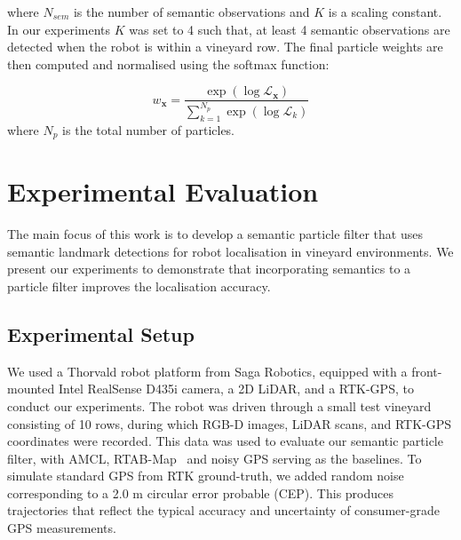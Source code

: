 \documentclass[letterpaper, 10 pt, conference]{ieeeconf}
\begin{document}
where $N_{sem}$ is the number of semantic observations and $K$ is a scaling constant. In our experiments $K$ was set to 4 such that, at least 4 semantic observations are detected when the robot is within a vineyard row. The final particle weights are then computed and normalised using the softmax function:

\begin{equation}
w_\mathbf{x} = \frac{\exp(\log \mathcal{L}_\mathbf{x})}{\sum_{k=1}^{N_p} \exp(\log \mathcal{L}_k)}
\end{equation}
%
where $N_p$ is the total number of particles.
\section{Experimental Evaluation}
\label{sec:exp}


The main focus of this work is to develop a semantic particle filter that uses semantic landmark detections for robot localisation in vineyard environments. We present our experiments to demonstrate that incorporating semantics to a particle filter improves the localisation accuracy. 

\subsection{Experimental Setup}
We used a Thorvald robot platform from Saga Robotics, equipped with a front-mounted Intel RealSense D435i camera, a 2D LiDAR, and a RTK-GPS, to conduct our experiments. The robot was driven through a small test vineyard consisting of 10 rows, during which RGB-D images, LiDAR scans, and RTK-GPS coordinates were recorded. This data was used to evaluate our semantic particle filter, with AMCL, RTAB-Map~\cite{rtabmap} and noisy GPS serving as the baselines. To simulate standard GPS from RTK ground-truth, we added random noise corresponding to a 2.0 m circular error probable (CEP). This produces trajectories that reflect the typical accuracy and uncertainty of consumer-grade GPS measurements.

\end{document}
